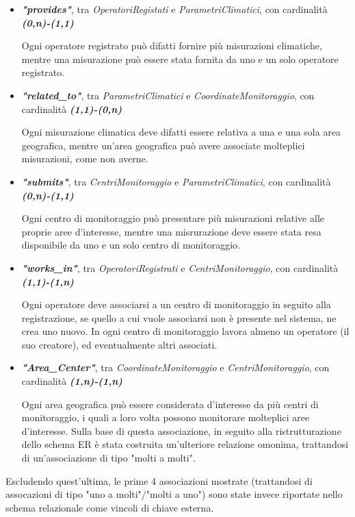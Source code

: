 	\begin{itemize}
		\item \textbf{\textit{"provides"}}, tra \textit{OperatoriRegistati} e \textit{ParametriClimatici}, con cardinalità \textbf{\textit{(0,n)-(1,1)}}
		
		Ogni operatore registrato può difatti fornire più misurazioni climatiche, mentre una misurazione può essere stata fornita da uno e un solo operatore registrato.
		\item \textbf{\textit{"related\_to"}}, tra \textit{ParametriClimatici} e \textit{CoordinateMonitoraggio}, con cardinalità \textbf{\textit{(1,1)-(0,n)}}
	
		Ogni misurazione climatica deve difatti essere relativa a una e una sola area geografica, mentre un'area geografica può avere associate molteplici misurazioni, come non averne.
		\item \textbf{\textit{"submits"}}, tra \textit{CentriMonitoraggio} e \textit{ParametriClimatici}, con cardinalità \textbf{\textit{(0,n)-(1,1)}}
		
		Ogni centro di monitoraggio può presentare più misurazioni relative alle proprie aree d'interesse, mentre una misrurazione deve essere stata resa disponibile da uno e un solo centro di monitoraggio.
		
		\item \textbf{\textit{"works\_in"}}, tra \textit{OperatoriRegistrati} e \textit{CentriMonitoraggio}, con cardinalità \textbf{\textit{(1,1)-(1,n)}}
	
		Ogni operatore deve associarsi a un centro di monitoraggio in seguito alla registrazione, se quello a cui vuole associarsi non è presente nel sistema, ne crea uno nuovo. In ogni centro di monitoraggio lavora almeno un operatore (il suo creatore), ed eventualmente altri associati.
		
		\item \textbf{\textit{"Area\_Center"}}, tra \textit{CoordinateMonitoraggio} e \textit{CentriMonitoraggio}, con cardinalità \textbf{\textit{(1,n)-(1,n)}}
		
		Ogni area geografica può essere considerata d'interesse da più centri di monitoraggio, i quali a loro volta possono monitorare molteplici aree d'interesse.
		Sulla base di questa associazione, in seguito alla ristrutturazione dello schema ER è stata costruita un'ulteriore relazione omonima, trattandosi di un'associazione di tipo "molti a molti".
	\end{itemize}
	Escludendo quest'ultima, le prime 4 associazioni mostrate (trattandosi di assocazioni di tipo "uno a molti"/"molti a uno") sono state invece riportate nello schema relazionale come vincoli di chiave esterna.
	\pagebreak
	
